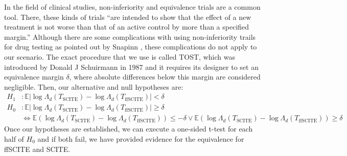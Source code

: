 In the field of clinical studies, non-inferiority and equivalence trials are a common tool. There, these kinds of trials ``are intended to show that the effect of a new treatment is not worse than that of an active control by more than a specified margin.'' \cite{snapinn2000noninferiority} Although there are some complications with using non-inferiority trails for drug testing as pointed out by Snapinn \cite{snapinn2000noninferiority}, these complications do not apply to our scenario. The exact procedure that we use is called \acf{TOST}, which was introduced by Donald J Schuirmann in 1987 \cite{schuirmann1987comparison} and it requires its designer to set an equivalence margin $\delta$, where absolute differences below this margin are considered negligible. Then, our alternative and null hypotheses are:
\begin{align*}
    H_1&: \mathbb{E} |\log\Lambda_d(T_\mathrm{SCITE}) - \log\Lambda_d(T_\mathrm{ffSCITE})| < \delta \\
    H_0&: \mathbb{E} |\log\Lambda_d(T_\mathrm{SCITE}) - \log\Lambda_d(T_\mathrm{ffSCITE})| \geq \delta \\
    &\Leftrightarrow \mathbb{E} \left(\log\Lambda_d(T_\mathrm{SCITE}) - \log\Lambda_d(T_\mathrm{ffSCITE})\right) \leq - \delta \vee \mathbb{E} \left(\log\Lambda_d(T_\mathrm{SCITE}) - \log\Lambda_d(T_\mathrm{ffSCITE})\right) \geq \delta
\end{align*}
Once our hypotheses are established, we can execute a one-sided t-test for each half of $H_0$ and if both fail, we have provided evidence for the equivalence for \ac{ffSCITE} and \ac{SCITE}.

